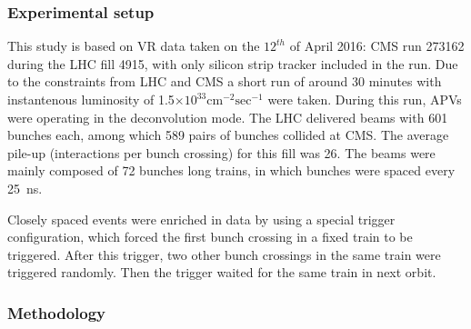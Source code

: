 \subsubsection{Experimental setup} 

This study is based on VR data taken on the $12^{th}$ of April 2016: CMS run 273162 during the LHC fill 4915, with only silicon strip tracker included in the run. Due to the constraints from LHC and CMS a short run of around 30 minutes with instantenous luminosity of 1.5$\times 10^{33} \mathrm{cm^{-2} sec^{-1}}$ were taken. During this run, APVs were operating in the deconvolution mode. The LHC delivered beams with 601 bunches each, among which 589 pairs of bunches collided at CMS. The average pile-up (interactions per bunch crossing) for this fill was 26. The beams were mainly composed of 72 bunches long trains, in which bunches were spaced every 25~ns.

Closely spaced events were enriched in data by using a special trigger configuration, which forced the first bunch crossing in a fixed train to be triggered. After this trigger, two other bunch crossings in the same train were triggered randomly. Then the trigger waited for the same train in next orbit. 





 \subsubsection{Methodology}
 

